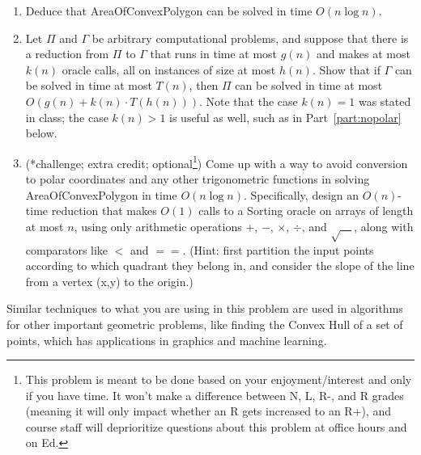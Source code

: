 \documentclass[11pt]{article}
\begin{document}
\begin{enumerate}
\begin{enumerate}
        \item Deduce that AreaOfConvexPolygon can be solved in time $O(n\log n)$.
        \item Let $\Pi$ and $\Gamma$ be arbitrary computational problems, and suppose that there is a reduction from $\Pi$ to $\Gamma$ that runs in time at most $g(n)$ and makes at most $k(n)$ oracle calls, all on instances of size at most $h(n)$.  Show that if $\Gamma$ can be solved in time at most $T(n)$, then $\Pi$ can be solved in time at most $O(g(n)+k(n)\cdot T(h(n)))$. Note that the case $k(n)=1$ was stated in class; the case $k(n)>1$ is useful as well, such as in Part~\ref{part:nopolar} below. 
        
        \item (*challenge; extra credit; optional\footnote{This problem is meant to be done based on your enjoyment/interest and only if you have time. It won't make a difference between N, L, R-, and R grades (meaning it will only impact whether an R gets increased to an R+), and course staff will deprioritize questions about this problem at office hours and on Ed.})  Come up with a way to avoid conversion to polar coordinates and any other trigonometric functions in solving AreaOfConvexPolygon in time $O(n\log n)$.  Specifically, design an $O(n)$-time reduction that makes $O(1)$ calls to a Sorting oracle on arrays of length at most $n$, using only arithmetic operations $+$, $-$, $\times$, $\div$, and $\sqrt{\hspace{1em}}$, along with comparators like $<$ and $==$.  (Hint: first partition the input points according to which quadrant they belong in, and consider the slope of the line from a vertex (x,y) to the origin.) \label{part:nopolar}
\end{enumerate}
    Similar techniques to what you are using in this problem are used in algorithms for other important geometric problems, like finding the Convex Hull of a set of points, which has applications in graphics and machine learning.

\end{enumerate}
\end{document}
